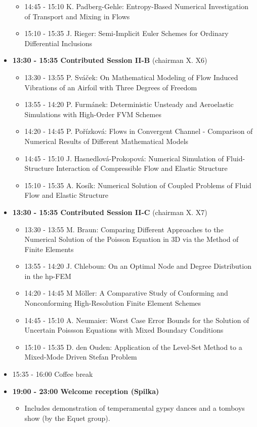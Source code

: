 \documentclass[10pt, A4]{article}%
\begin{document}
\begin{itemize}
\begin{itemize}
    \item 14:45 - 15:10 K. Padberg-Gehle: Entropy-Based Numerical Investigation of Transport and Mixing in Flows
    \item 15:10 - 15:35 J. Rieger: Semi-Implicit Euler Schemes for Ordinary Differential Inclusions
  \end{itemize}
  \item {\bf 13:30 - 15:35 Contributed Session II-B} (chairman X. X6) 
  \begin{itemize}
    \item 13:30 - 13:55 P. Sv\'{a}\v{c}ek: On Mathematical Modeling of Flow Induced Vibrations of an Airfoil with Three Degrees of Freedom
    \item 13:55 - 14:20 P. Furm\'{a}nek: Deterministic Unsteady and Aeroelastic Simulations with High-Order FVM Schemes
    \item 14:20 - 14:45 P. Po\v{r}\'{i}zkov\'{a}: Flows in Convergent Channel - Comparison of Numerical Results of Different Mathematical Models
    \item 14:45 - 15:10 J. Hasnedlov\'{a}-Prokopov\'{a}: Numerical Simulation of Fluid-Structure Interaction of Compressible Flow and Elastic Structure
    \item 15:10 - 15:35 A. Kos\'{i}k: Numerical Solution of Coupled Problems of Fluid Flow and Elastic Structure
  \end{itemize}
    \item {\bf 13:30 - 15:35 Contributed Session II-C} (chairman X. X7) 
  \begin{itemize}
    \item 13:30 - 13:55 M. Braun: Comparing Different Approaches to the Numerical Solution of the Poisson Equation in 3D via the Method of Finite Elements
    \item 13:55 - 14:20 J. Chleboun: On an Optimal Node and Degree Distribution in the hp-FEM
    \item 14:20 - 14:45 M M\"{o}ller: A Comparative Study of Conforming and Nonconforming
High-Resolution Finite Element Schemes
    \item 14:45 - 15:10 A. Neumaier: Worst Case Error Bounds for the Solution of Uncertain Poissson
Equations with Mixed Boundary Conditions
    \item 15:10 - 15:35 D. den Ouden: Application of the Level-Set Method to a Mixed-Mode Driven Stefan
Problem
  \end{itemize}
  \item 15:35 - 16:00 Coffee break
  \item {\bf 19:00 - 23:00 Welcome reception (Spilka)} 
  \begin{itemize}
     \item Includes demonstration of temperamental gypsy dances and a tomboys show (by the Equet group).  
  \end{itemize}
\end{itemize}
\end{document}
